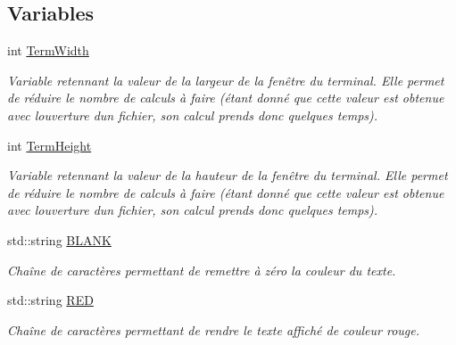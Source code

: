 \subsection*{Variables}
\begin{DoxyCompactItemize}
\item 
\mbox{\label{namespaceio_a09b19ec88fb58a6086ca54be52b7bc08}} 
int \hyperlink{namespaceio_a09b19ec88fb58a6086ca54be52b7bc08}{Term\+Width}
\begin{DoxyCompactList}\small\item\em Variable retennant la valeur de la largeur de la fenêtre du terminal. Elle permet de réduire le nombre de calculs à faire (étant donné que cette valeur est obtenue avec l\textquotesingle{}ouverture d\textquotesingle{}un fichier, son calcul prends donc quelques temps). \end{DoxyCompactList}\item 
\mbox{\label{namespaceio_afaeef00a45e14dc7227025fa7fd27240}} 
int \hyperlink{namespaceio_afaeef00a45e14dc7227025fa7fd27240}{Term\+Height}
\begin{DoxyCompactList}\small\item\em Variable retennant la valeur de la hauteur de la fenêtre du terminal. Elle permet de réduire le nombre de calculs à faire (étant donné que cette valeur est obtenue avec l\textquotesingle{}ouverture d\textquotesingle{}un fichier, son calcul prends donc quelques temps). \end{DoxyCompactList}\item 
\mbox{\label{namespaceio_a24918bdd47093eb3f11b694ad6f832d4}} 
std\+::string \hyperlink{namespaceio_a24918bdd47093eb3f11b694ad6f832d4}{B\+L\+A\+NK}
\begin{DoxyCompactList}\small\item\em Chaîne de caractères permettant de remettre à zéro la couleur du texte. \end{DoxyCompactList}\item 
\mbox{\label{namespaceio_ac9181eea4e6d57e5481bc7e5822de4cb}} 
std\+::string \hyperlink{namespaceio_ac9181eea4e6d57e5481bc7e5822de4cb}{R\+ED}
\begin{DoxyCompactList}\small\item\em Chaîne de caractères permettant de rendre le texte affiché de couleur rouge. \end{DoxyCompactList}\item 

\end{DoxyCompactItemize}
